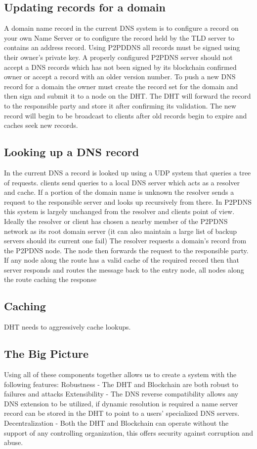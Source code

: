\documentclass[11pt]{ieeetran} %
\begin{document}
\subsection{Updating records for a domain}
A domain name record in the current DNS system is to configure a record on your own Name Server or to configure the record held by the TLD server to contains an address record. Using P2PDDNS all records must be signed using their owner's private key. A properly configured P2PDNS server should not accept a DNS records which has not been signed by its blockchain confirmed owner or accept a record with an older version number. To push a new DNS record for a domain the owner must create the record set for the domain and then sign and submit it to a node on the DHT. The DHT will forward the record to the responsible party and store it after confirming its validation. The new record will begin to be broadcast to clients after old records begin to expire and caches seek new records.

\subsection{Looking up a DNS record}
In the current DNS a record is looked up using a UDP system that queries a tree of requests. clients send queries to a local DNS server which acts as a resolver and cache. If a portion of the domain name is unknown the resolver sends a request to the responsible server and looks up recursively from there.
In P2PDNS this system is largely unchanged from the resolver and clients point of view. Ideally the resolver or client has chosen a nearby member of the P2PDNS network as its root domain server (it can also maintain a large list of backup servers should its current one fail) The resolver requests a domain’s record from the P2PDNS node. The node then forwards the request to the responsible party. If any node along the route has a valid cache of the required record then that server responds and routes the message back to the entry node, all nodes along the route caching the response

\subsection{Caching}

DHT needs to aggressively cache lookups.  \cite{irm}

\subsection{The Big Picture}
Using all of these components together allows us to create a system with the following features:
Robustness - The DHT and Blockchain are both robust to failures and attacks
Extensibility - The DNS reverse compatibility allows any DNS extension to be utilized, if dynamic resolution is required a name server record can be stored in the DHT to point to a users’ specialized DNS servers.
Decentralization - Both the DHT and Blockchain can operate without the support of any controlling organization, this offers security against corruption and abuse.
	


\end{document}
